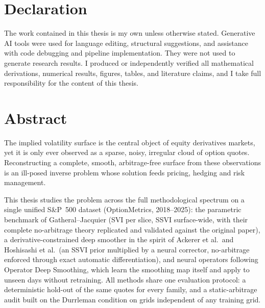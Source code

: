 \documentclass[11pt,a4paper]{report}
\theoremstyle{definition}
\theoremstyle{remark}
\theoremstyle{plain}
\begin{document}
\chapter*{Declaration}

The work contained in this thesis is my own unless otherwise stated. Generative AI tools were used for language editing, structural suggestions, and assistance with code debugging and pipeline implementation. They were not used to generate research results. I produced or independently verified all mathematical derivations, numerical results, figures, tables, and literature claims, and I take full responsibility for the content of this thesis.



\chapter*{Abstract}






\hspace*{1em} The implied volatility surface is the central object of equity derivatives markets, yet it is only ever observed as a sparse, noisy, irregular cloud of option quotes. Reconstructing a complete, smooth, arbitrage-free surface from these observations is an ill-posed inverse problem whose solution feeds pricing, hedging and risk management. 

\hspace*{1em} This thesis studies the problem across the full methodological spectrum on a single unified S\&P~500 dataset (OptionMetrics, 2018--2025): the parametric benchmark of Gatheral--Jacquier (SVI per slice, SSVI surface-wide, with their complete no-arbitrage theory replicated and validated against the original paper), a
derivative-constrained deep smoother in the spirit of Ackerer et al.\ and Hoshisashi et al.\
(an SSVI prior multiplied by a neural corrector, no-arbitrage enforced through exact automatic
differentiation), and neural operators following Operator Deep Smoothing, which learn the
smoothing map itself and apply to unseen days without retraining. All methods share one
evaluation protocol: a deterministic hold-out of the same quotes for every family, and a
static-arbitrage audit built on the Durrleman condition on grids independent of any training
grid.
\end{document}
